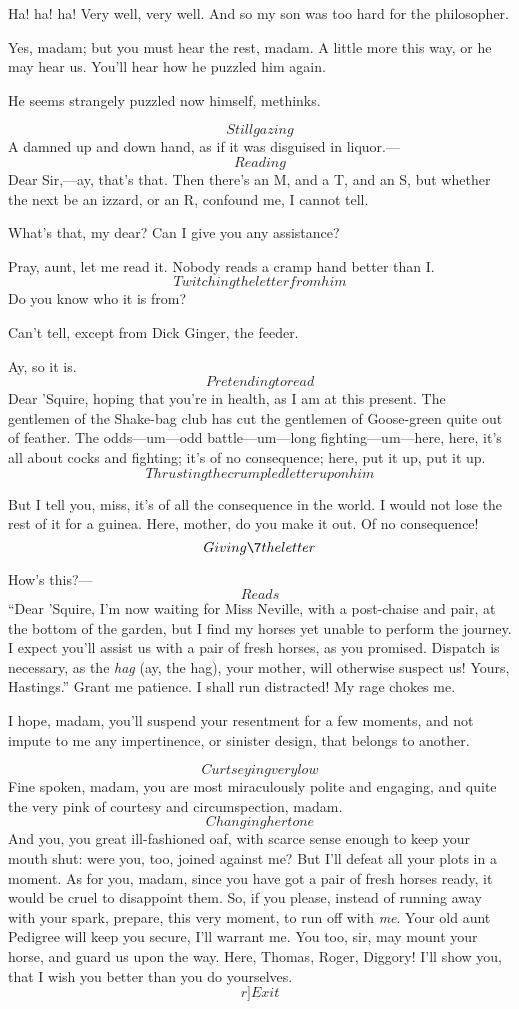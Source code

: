 \documentclass{book}
\begin{document}
\7  Ha! ha! ha!  Very well, very well.  And so my son was
too hard for the philosopher.

\9  Yes, madam; but you must hear the rest, madam.  A
little more this way, or he may hear us.  You'll hear how he puzzled
him again.

\7  He seems strangely puzzled now himself, methinks.

\5  \[Still gazing\]  A damned up and down hand, as if it was
disguised in liquor.---\[Reading\]  Dear Sir,---ay, that's that.  Then
there's an M, and a T, and an S, but whether the next be an izzard, or
an R, confound me, I cannot tell.

\7  What's that, my dear?  Can I give you any
assistance?

\9  Pray, aunt, let me read it.  Nobody reads a cramp hand
better than I. \[Twitching the letter from him\]  Do you know who it is
from?

\5  Can't tell, except from Dick Ginger, the feeder.

\9  Ay, so it is.  \[Pretending to read\]  Dear 'Squire,
hoping that you're in health, as I am at this present.  The gentlemen
of the Shake-bag club has cut the gentlemen of Goose-green quite out of
feather.  The odds---um---odd battle---um---long fighting---um---here, here,
it's all about cocks and fighting; it's of no consequence; here, put it
up, put it up.  \[Thrusting the crumpled letter upon him\]

\5  But I tell you, miss, it's of all the consequence in the world. 
I would not lose the rest of it for a guinea.  Here, mother, do you
make it out.  Of no consequence!  \[Giving \7 the letter\]

\7  How's this?---\[Reads\]  ``Dear 'Squire, I'm now
waiting for Miss Neville, with a post-chaise and pair, at the bottom of
the garden, but I find my horses yet unable to perform the journey.  I
expect you'll assist us with a pair of fresh horses, as you promised. 
Dispatch is necessary, as the \textit{hag} (ay, the hag), your mother, will
otherwise suspect us!  Yours, Hastings.''  Grant me patience.  I shall
run distracted!  My rage chokes me.

\9  I hope, madam, you'll suspend your resentment for a few
moments, and not impute to me any impertinence, or sinister design,
that belongs to another.

\7  \[Curtseying very low\]  Fine spoken, madam, you are
most miraculously polite and engaging, and quite the very pink of
courtesy and circumspection, madam.  \[Changing her tone\]  And you, you
great ill-fashioned oaf, with scarce sense enough to keep your mouth
shut: were you, too, joined against me?  But I'll defeat all your plots
in a moment.  As for you, madam, since you have got a pair of fresh
horses ready, it would be cruel to disappoint them.  So, if you please,
instead of running away with your spark, prepare, this very moment, to
run off with \textit{me}.  Your old aunt Pedigree will keep you secure, I'll
warrant me.  You too, sir, may mount your horse, and guard us upon the
way.  Here, Thomas, Roger, Diggory!  I'll show you, that I wish you
better than you do yourselves.  \[r]Exit\]
\end{document}
